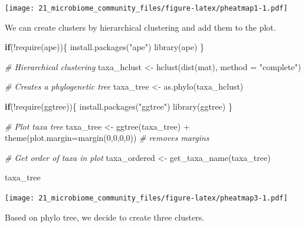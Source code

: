 \documentclass[
]{book}
\newenvironment{Shaded}{\begin{snugshade}}{\end{snugshade}}
\newcommand{\AttributeTok}[1]{\textcolor[rgb]{0.77,0.63,0.00}{#1}}
\newcommand{\CommentTok}[1]{\textcolor[rgb]{0.56,0.35,0.01}{\textit{#1}}}
\newcommand{\ControlFlowTok}[1]{\textcolor[rgb]{0.13,0.29,0.53}{\textbf{#1}}}
\newcommand{\DecValTok}[1]{\textcolor[rgb]{0.00,0.00,0.81}{#1}}
\newcommand{\FunctionTok}[1]{\textcolor[rgb]{0.00,0.00,0.00}{#1}}
\newcommand{\NormalTok}[1]{#1}
\newcommand{\OtherTok}[1]{\textcolor[rgb]{0.56,0.35,0.01}{#1}}
\newcommand{\SpecialCharTok}[1]{\textcolor[rgb]{0.00,0.00,0.00}{#1}}
\newcommand{\StringTok}[1]{\textcolor[rgb]{0.31,0.60,0.02}{#1}}
\begin{document}
\texttt{[image: 21\_microbiome\_community\_files/figure-latex/pheatmap1-1.pdf]}

We can create clusters by hierarchical clustering and add them to the plot.

\begin{Shaded}
\begin{Highlighting}[]
\ControlFlowTok{if}\NormalTok{(}\SpecialCharTok{!}\FunctionTok{require}\NormalTok{(ape))\{}
    \FunctionTok{install.packages}\NormalTok{(}\StringTok{"ape"}\NormalTok{)}
    \FunctionTok{library}\NormalTok{(ape)}
\NormalTok{\}}

\CommentTok{\# Hierarchical clustering}
\NormalTok{taxa\_hclust }\OtherTok{\textless{}{-}} \FunctionTok{hclust}\NormalTok{(}\FunctionTok{dist}\NormalTok{(mat), }\AttributeTok{method =} \StringTok{"complete"}\NormalTok{)}

\CommentTok{\# Creates a phylogenetic tree}
\NormalTok{taxa\_tree }\OtherTok{\textless{}{-}} \FunctionTok{as.phylo}\NormalTok{(taxa\_hclust)}
\end{Highlighting}
\end{Shaded}

\begin{Shaded}
\begin{Highlighting}[]
\ControlFlowTok{if}\NormalTok{(}\SpecialCharTok{!}\FunctionTok{require}\NormalTok{(ggtree))\{}
    \FunctionTok{install.packages}\NormalTok{(}\StringTok{"ggtree"}\NormalTok{)}
    \FunctionTok{library}\NormalTok{(ggtree)}
\NormalTok{\}}

\CommentTok{\# Plot taxa tree}
\NormalTok{taxa\_tree }\OtherTok{\textless{}{-}} \FunctionTok{ggtree}\NormalTok{(taxa\_tree) }\SpecialCharTok{+} 
  \FunctionTok{theme}\NormalTok{(}\AttributeTok{plot.margin=}\FunctionTok{margin}\NormalTok{(}\DecValTok{0}\NormalTok{,}\DecValTok{0}\NormalTok{,}\DecValTok{0}\NormalTok{,}\DecValTok{0}\NormalTok{)) }\CommentTok{\# removes margins}

\CommentTok{\# Get order of taxa in plot}
\NormalTok{taxa\_ordered }\OtherTok{\textless{}{-}} \FunctionTok{get\_taxa\_name}\NormalTok{(taxa\_tree)}

\NormalTok{taxa\_tree}
\end{Highlighting}
\end{Shaded}

\texttt{[image: 21\_microbiome\_community\_files/figure-latex/pheatmap3-1.pdf]}

Based on phylo tree, we decide to create three clusters.
\end{document}
